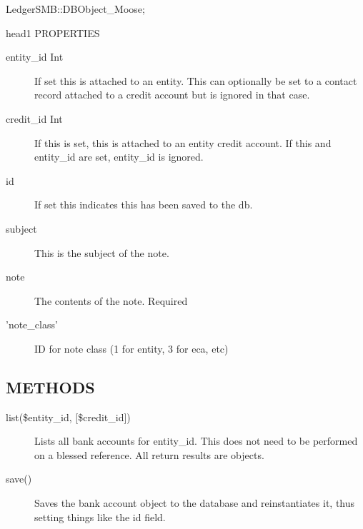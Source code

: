 \begin{description}
\begin{description}
\begin{description}
\begin{description}
\begin{description}
\begin{description}
\begin{description}
\begin{description}
\begin{description}
\item[{LedgerSMB::DBObject\_Moose;}] \mbox{}\end{description}


head1 PROPERTIES

\begin{description}

\item[{entity\_id Int}] \mbox{}

If set this is attached to an entity.  This can optionally be set to a contact
record attached to a credit account but is ignored in that case.


\item[{credit\_id Int}] \mbox{}

If this is set, this is attached to an entity credit account.  If this and
entity\_id are set, entity\_id is ignored.


\item[{id}] \mbox{}

If set this indicates this has been saved to the db.


\item[{subject}] \mbox{}

This is the subject of the note.


\item[{note}] \mbox{}

The contents of the note.  Required


\item[{'note\_class'}] \mbox{}

ID for note class (1 for entity, 3 for eca, etc)

\end{description}
\subsection*{METHODS\label{LedgerSMB::DBObject::Entity::Note_METHODS}}
\begin{description}

\item[{list(\$entity\_id, [\$credit\_id])}] \mbox{}

Lists all bank accounts for entity\_id.  This does not need to be performed on a
blessed reference.  All return results are objects.


\item[{save()}] \mbox{}

Saves the bank account object to the database and reinstantiates it, thus
setting things like the id field.


\end{description}
\end{description}
\end{description}
\end{description}
\end{description}
\end{description}
\end{description}
\end{description}
\end{description}
